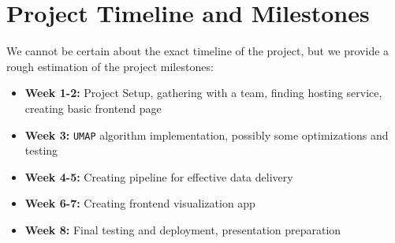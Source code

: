 \documentclass{article}
\begin{document}
\section{Project Timeline and Milestones}
We cannot be certain about the exact timeline of the project, but we
provide a rough estimation of the project milestones:

\begin{itemize}
	\item \textbf{Week 1-2:} Project Setup, gathering with a team,
	      finding hosting service, creating basic frontend page
	\item \textbf{Week 3:} \texttt{UMAP} algorithm implementation,
	      possibly some optimizations and testing
	\item \textbf{Week 4-5:} Creating pipeline for effective data delivery
	\item \textbf{Week 6-7:} Creating frontend visualization app
	\item \textbf{Week 8:} Final testing and deployment, presentation
	      preparation
\end{itemize}
\end{document}
